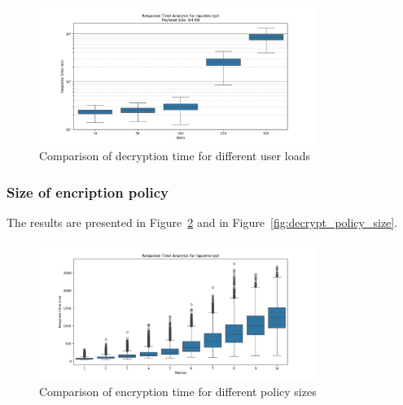 \documentclass[cic,tc,english]{iiufrgs}
\begin{document}
                \begin{figure}
                    \centering
                    \includegraphics[width=0.8\textwidth]{images/phase3/response_time_api_decrypt_64KB.png}
                    \caption{Comparison of decryption time for different user loads}
                    \label{fig:decrypt_user_load}
                \end{figure}

            \subsubsection{Size of encription policy}
                The results are presented in Figure~\ref{fig:encrypt_policy_size} and in Figure~\ref{fig:decrypt_policy_size}.


                \begin{figure}
                    \centering
                    \includegraphics[width=0.8\textwidth]{images/phase4/response_time_api_encrypt.png}
                    \caption{Comparison of encryption time for different policy sizes}
                    \label{fig:encrypt_policy_size}
                \end{figure}
\end{document}
